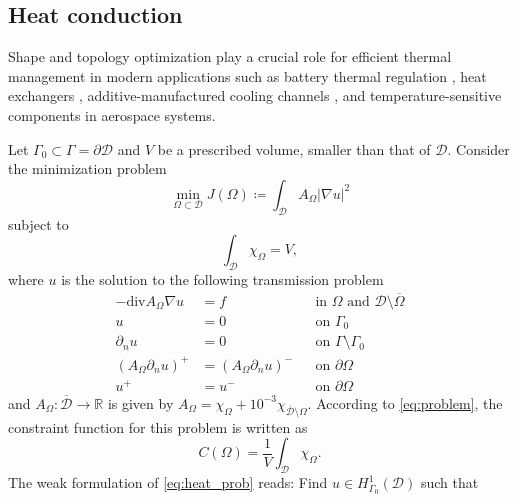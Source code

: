 \documentclass[preprint,9pt]{elsarticle}
\begin{document}
\subsection{Heat conduction}\label{sub:heat}

Shape and topology optimization play a crucial role
for efficient thermal management 
in modern applications such as battery thermal regulation \cite{Mo2021},
heat exchangers \cite{GAO2008805},
additive-manufactured cooling channels \cite{LamarcheGagnon2024}, and
temperature-sensitive components in aerospace systems.

Let $\Gamma_0\subset\Gamma=\partial\mathcal{D}$ and  $V$ be a prescribed volume,
smaller than that of $\mathcal{D}$.
Consider the minimization problem
\begin{equation}\label{eq:heat_cost}
	\min_{\Omega\subset\mathcal{D}}
	J(\Omega)\coloneqq\int_{\mathcal{D}} A_{\Omega}|\nabla u|^{2}
\end{equation}
subject to
\begin{equation}
	\int_{\mathcal{D}} \chi_{\Omega} = V,
\end{equation}
where $u$ is the solution to the following transmission problem
\begin{equation} \label{eq:heat_prob}
\begin{aligned}
-\mathrm{div} A_{\Omega} \nabla u &= f && \text{in } \Omega \text{ and } \mathcal{D}\setminus\overline{\Omega}\\
								u &= 0 && \text{on } \Gamma_{0}\\
					\partial_{n} u &= 0 && \text{on } \Gamma\setminus\Gamma_{0}\\
	(A_{\Omega} \partial_{n} u)^+ &= (A_{\Omega} \partial_{n} u)^- && \text{on }  \partial\Omega\\
								u^+ &= u^- && \text{on }  \partial\Omega        
\end{aligned}	
\end{equation}
and $A_{\Omega}\colon\overline{\mathcal{D}}\to\mathds{R}$ is given by
$A_{\Omega} = \chi_{\Omega} +
	{10}^{-3}\chi_{\overline{\mathcal{D}}\setminus\Omega}.$
According to \eqref{eq:problem}, the constraint function for this problem
is written as
\begin{equation}
	C(\Omega) = \frac{1}{V} \int_{\mathcal{D}} \chi_{\Omega}.
\end{equation}
The weak formulation of \eqref{eq:heat_prob} reads:
Find $u\in H^1_{\Gamma_0}(\mathcal{D})$ such that
\end{document}
